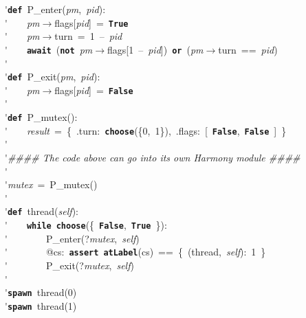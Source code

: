 \'\>\texttt{\textbf{def}}~P\_enter(\textit{pm},~\textit{pid}):\\

\'\>~~~~\textit{pm}$\rightarrow$flags[\textit{pid}]~=~\texttt{\textbf{True}}\\

\'\>~~~~\textit{pm}$\rightarrow$turn~=~1~--~\textit{pid}\\

\'\>~~~~\texttt{\textbf{await}}~(\texttt{\textbf{not}}~\textit{pm}$\rightarrow$flags[1~--~\textit{pid}])~\texttt{\textbf{or}}~(\textit{pm}$\rightarrow$turn~==~\textit{pid})\\

\'\>\\

\'\>\texttt{\textbf{def}}~P\_exit(\textit{pm},~\textit{pid}):\\

\'\>~~~~\textit{pm}$\rightarrow$flags[\textit{pid}]~=~\texttt{\textbf{False}}\\

\'\>\\

\'\>\texttt{\textbf{def}}~P\_mutex():\\

\'\>~~~~\textit{result}~=~\{~.turn:~\texttt{\textbf{choose}}(\{0,~1\}),~.flags:~[~\texttt{\textbf{False}},~\texttt{\textbf{False}}~]~\}\\

\'\>\\

\'\>\emph{\#\#\#\# The code above can go into its own Harmony module \#\#\#\#}\\

\'\>\\

\'\>\textit{mutex}~=~P\_mutex()\\

\'\>\\

\'\>\texttt{\textbf{def}}~thread(\textit{self}):\\

\'\>~~~~\texttt{\textbf{while}}~\texttt{\textbf{choose}}(\{~\texttt{\textbf{False}},~\texttt{\textbf{True}}~\}):\\

\'\>~~~~~~~~P\_enter(?\textit{mutex},~\textit{self})\\

\'\>~~~~~~~~@cs:~\texttt{\textbf{assert}}~\texttt{\textbf{atLabel}}(cs)~==~\{~(thread,~\textit{self}):~1~\}\\

\'\>~~~~~~~~P\_exit(?\textit{mutex},~\textit{self})\\

\'\>\\

\'\>\texttt{\textbf{spawn}}~thread(0)\\

\'\>\texttt{\textbf{spawn}}~thread(1)
